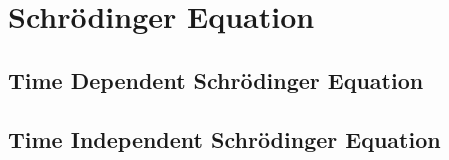 \section{Schrödinger Equation}
\subsection{Time Dependent Schrödinger Equation}
\subsection{Time Independent Schrödinger Equation}
